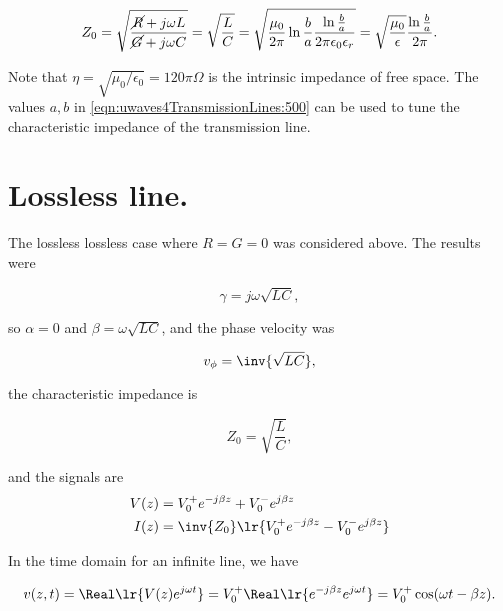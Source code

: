 {\begin{dmath}\label{eqn:uwaves4TransmissionLines:500}
Z_0
= \sqrt{ \frac{\cancel{R} + j \omega L}{\cancel{G} + j \omega C} }
= \sqrt{ \frac{L}{C} }
= \sqrt{
\frac{\mu_0}{ 2 \pi } \ln \frac{b}{a}
\frac{ \ln \frac{b}{a} }
{2 \pi \epsilon_0 \epsilon_r }
}
=
\sqrt{ \frac{\mu_0}{\epsilon} } \frac{ \ln \frac{b}{a} }{ 2 \pi }.
\end{dmath}

Note that \( \eta = \sqrt{\mu_0/\epsilon_0} = 120 \pi \Omega \) is the intrinsic impedance of free space.  The values \( a, b \) in \cref{eqn:uwaves4TransmissionLines:500} can be used to tune the characteristic impedance of the transmission line.

} %

\section{Lossless line.}

The lossless lossless case where \( R = G = 0 \) was considered above.  The results were

\begin{dmath}\label{eqn:uwaves4TransmissionLines:540}
\gamma = j \omega \sqrt{ L C },
\end{dmath}

so \( \alpha = 0 \) and \( \beta = \omega \sqrt{LC} \), and the phase velocity was

\begin{dmath}\label{eqn:uwaves4TransmissionLines:560}
v_\phi = \inv{\sqrt{LC}},
\end{dmath}

the characteristic impedance is

\begin{dmath}\label{eqn:uwaves4TransmissionLines:580}
Z_0 = \sqrt{\frac{L}{C}},
\end{dmath}

and the signals are
\begin{equation}\label{eqn:uwaves4TransmissionLines:600}
\begin{aligned}
V(z) &= V_0^{+} e^{-j \beta z} + V_0^{-} e^{j \beta z} \\
I(z) &= \inv{Z_0} \lr{ V_0^{+} e^{-j \beta z} - V_0^{-} e^{j \beta z} }
\end{aligned}
\end{equation}

In the time domain for an infinite line, we have

\begin{dmath}\label{eqn:uwaves4TransmissionLines:620}
v(z, t)
= \Real\lr{ V(z) e^{j \omega t} }
= V_0^{+} \Real\lr{ e^{-j \beta z} e^{j \omega t} }
= V_0^{+} \cos( \omega t - \beta z ).
\end{dmath}

